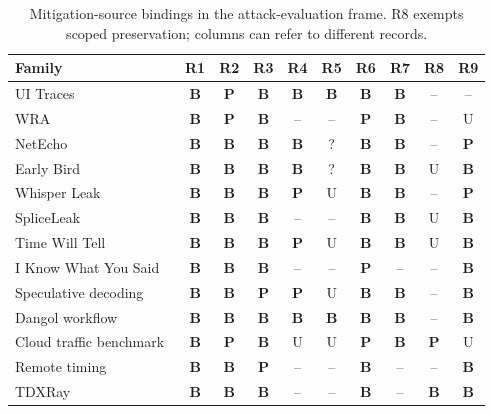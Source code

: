 \begin{table}[t]\centering\footnotesize
\caption{Mitigation-source bindings in the attack-evaluation frame. R8 exempts scoped preservation; columns can refer to different records.}\label{tab:r42-family-supp}
\setlength{\tabcolsep}{2.2pt}
\begin{tabularx}{\columnwidth}{@{}Y*{9}{c}@{}}\toprule
Family & R1 & R2 & R3 & R4 & R5 & R6 & R7 & R8 & R9\\\midrule
UI Traces~\cite{uitraces2026} & \textbf{B} & \textbf{P} & \textbf{B} & \textbf{B} & \textbf{B} & \textbf{B} & \textbf{B} & -- & --\\
WRA~\cite{jeong2026wra} & \textbf{B} & \textbf{P} & \textbf{B} & -- & -- & \textbf{P} & \textbf{B} & -- & U\\
NetEcho~\cite{netecho2025} & \textbf{B} & \textbf{B} & \textbf{B} & \textbf{B} & ? & \textbf{B} & \textbf{B} & -- & \textbf{P}\\
Early Bird~\cite{earlybird2025} & \textbf{B} & \textbf{B} & \textbf{B} & \textbf{B} & ? & \textbf{B} & \textbf{B} & U & \textbf{B}\\
Whisper Leak~\cite{whisperleak2025} & \textbf{B} & \textbf{B} & \textbf{B} & \textbf{P} & U & \textbf{B} & \textbf{B} & -- & \textbf{P}\\
SpliceLeak~\cite{spliceleak2026} & \textbf{B} & \textbf{B} & \textbf{B} & -- & -- & \textbf{B} & \textbf{B} & U & \textbf{B}\\
Time Will Tell~\cite{timewilltell2024} & \textbf{B} & \textbf{B} & \textbf{B} & \textbf{P} & U & \textbf{B} & \textbf{B} & U & \textbf{B}\\
I Know What You Said~\cite{gao2025iknow} & \textbf{B} & \textbf{B} & \textbf{B} & -- & -- & \textbf{P} & -- & -- & \textbf{B}\\
Speculative decoding~\cite{wei2024speculation} & \textbf{B} & \textbf{B} & \textbf{P} & \textbf{P} & U & \textbf{B} & \textbf{B} & -- & \textbf{B}\\
Dangol workflow~\cite{dangol2026workflow} & \textbf{B} & \textbf{B} & \textbf{B} & \textbf{B} & \textbf{B} & \textbf{B} & \textbf{B} & -- & \textbf{B}\\
Cloud traffic benchmark~\cite{pouryousef2026traffic} & \textbf{B} & \textbf{P} & \textbf{B} & U & U & \textbf{P} & \textbf{B} & \textbf{P} & U\\
Remote timing~\cite{carlini2024remote} & \textbf{B} & \textbf{B} & \textbf{P} & -- & -- & \textbf{B} & -- & -- & \textbf{B}\\
TDXRay~\cite{hornetz2026tdxray} & \textbf{B} & \textbf{B} & \textbf{B} & -- & -- & \textbf{B} & -- & \textbf{B} & \textbf{B}\\

\end{tabularx}
\end{table}
